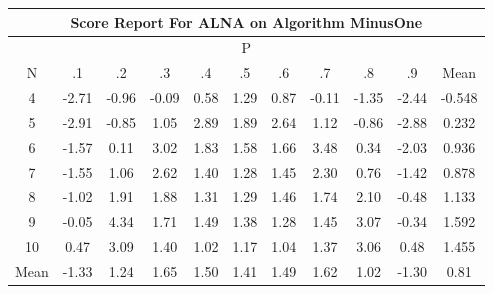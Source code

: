\documentclass[11pt,a4paper]{report}
\begin{document}
\begin{longtable}{ | c || c | c | c | c | c | c | c | c | c || c |}
\hline
\multicolumn{11}{|c|}{ Score Report For ALNA on Algorithm MinusOne} \\
\hline
\multicolumn{11}{|c|}{ P } \\
\hline
N & .1 & .2 & .3 & .4 & .5 & .6 & .7 & .8 & .9 & Mean\\
 \hline
 \hline
 \endhead
  4 &  \cellcolor[HTML]{FFB7B7} -2.71 &  \cellcolor[HTML]{FFE7E7} -0.96 &  \cellcolor[HTML]{FFFFFF} -0.09 &  \cellcolor[HTML]{EFEFFF} 0.58 &  \cellcolor[HTML]{DFDFFF} 1.29 &  \cellcolor[HTML]{E7E7FF} 0.87 &  \cellcolor[HTML]{FFFFFF} -0.11 &  \cellcolor[HTML]{FFDFDF} -1.35 &  \cellcolor[HTML]{FFBFBF} -2.44 & -0.548 \\
  5 &  \cellcolor[HTML]{FFB7B7} -2.91 &  \cellcolor[HTML]{FFE7E7} -0.85 &  \cellcolor[HTML]{E7E7FF} 1.05 &  \cellcolor[HTML]{B7B7FF} 2.89 &  \cellcolor[HTML]{CFCFFF} 1.89 &  \cellcolor[HTML]{BFBFFF} 2.64 &  \cellcolor[HTML]{DFDFFF} 1.12 &  \cellcolor[HTML]{FFE7E7} -0.86 &  \cellcolor[HTML]{FFB7B7} -2.88 & 0.232 \\
  6 &  \cellcolor[HTML]{FFD7D7} -1.57 &  \cellcolor[HTML]{FFFFFF} 0.11 &  \cellcolor[HTML]{AFAFFF} 3.02 &  \cellcolor[HTML]{CFCFFF} 1.83 &  \cellcolor[HTML]{D7D7FF} 1.58 &  \cellcolor[HTML]{D7D7FF} 1.66 &  \cellcolor[HTML]{A7A7FF} 3.48 &  \cellcolor[HTML]{F7F7FF} 0.34 &  \cellcolor[HTML]{FFCFCF} -2.03 & 0.936 \\
  7 &  \cellcolor[HTML]{FFD7D7} -1.55 &  \cellcolor[HTML]{E7E7FF} 1.06 &  \cellcolor[HTML]{BFBFFF} 2.62 &  \cellcolor[HTML]{DFDFFF} 1.40 &  \cellcolor[HTML]{DFDFFF} 1.28 &  \cellcolor[HTML]{D7D7FF} 1.45 &  \cellcolor[HTML]{C7C7FF} 2.30 &  \cellcolor[HTML]{EFEFFF} 0.76 &  \cellcolor[HTML]{FFDFDF} -1.42 & 0.878 \\
  8 &  \cellcolor[HTML]{FFE7E7} -1.02 &  \cellcolor[HTML]{CFCFFF} 1.91 &  \cellcolor[HTML]{CFCFFF} 1.88 &  \cellcolor[HTML]{DFDFFF} 1.31 &  \cellcolor[HTML]{DFDFFF} 1.29 &  \cellcolor[HTML]{D7D7FF} 1.46 &  \cellcolor[HTML]{D7D7FF} 1.74 &  \cellcolor[HTML]{C7C7FF} 2.10 &  \cellcolor[HTML]{FFEFEF} -0.48 & 1.133 \\
  9 &  \cellcolor[HTML]{FFFFFF} -0.05 &  \cellcolor[HTML]{8F8FFF} 4.34 &  \cellcolor[HTML]{D7D7FF} 1.71 &  \cellcolor[HTML]{D7D7FF} 1.49 &  \cellcolor[HTML]{DFDFFF} 1.38 &  \cellcolor[HTML]{DFDFFF} 1.28 &  \cellcolor[HTML]{D7D7FF} 1.45 &  \cellcolor[HTML]{AFAFFF} 3.07 &  \cellcolor[HTML]{FFF7F7} -0.34 & 1.592 \\
  10 &  \cellcolor[HTML]{F7F7FF} 0.47 &  \cellcolor[HTML]{AFAFFF} 3.09 &  \cellcolor[HTML]{DFDFFF} 1.40 &  \cellcolor[HTML]{E7E7FF} 1.02 &  \cellcolor[HTML]{DFDFFF} 1.17 &  \cellcolor[HTML]{E7E7FF} 1.04 &  \cellcolor[HTML]{DFDFFF} 1.37 &  \cellcolor[HTML]{AFAFFF} 3.06 &  \cellcolor[HTML]{EFEFFF} 0.48 & 1.455 \\
 \hline
 \hline
Mean &  \cellcolor[HTML]{FFDFDF} -1.33 &  \cellcolor[HTML]{DFDFFF} 1.24 &  \cellcolor[HTML]{D7D7FF} 1.65 &  \cellcolor[HTML]{D7D7FF} 1.50 &  \cellcolor[HTML]{DFDFFF} 1.41 &  \cellcolor[HTML]{D7D7FF} 1.49 &  \cellcolor[HTML]{D7D7FF} 1.62 &  \cellcolor[HTML]{E7E7FF} 1.02 &  \cellcolor[HTML]{FFDFDF} -1.30 &  \cellcolor[HTML]{E7E7FF} 0.81
\end{longtable}
\end{document}
